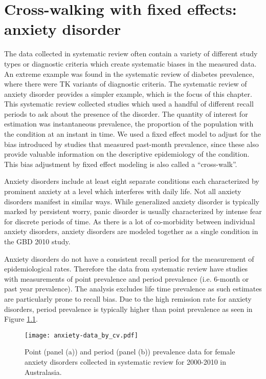 \chapter{Cross-walking with fixed effects: anxiety disorder}
\label{applications-efx_study_level}

The data collected in systematic review often contain a variety of
different study types or diagnostic criteria which create systematic
biases in the measured data.  An extreme example was found in the
systematic review of diabetes prevalence, where there were TK variants
of diagnostic criteria.  The systematic review of anxiety disorder
provides a simpler example, which is the focus of this chapter. This
systematic review collected studies which used a handful of different
recall periods to ask about the presence of the disorder. The quantity
of interest for estimation was instantaneous prevalence, the
proportion of the population with the condition at an instant in time.
We used a fixed effect model to adjust for the bias introduced by
studies that measured past-month prevalence, since these also provide
valuable information on the descriptive epidemiology of the condition.
This bias adjustment by fixed effect modeling is also called a
``cross-walk''.

Anxiety disorders include at least eight separate conditions each
characterized by prominent anxiety at a level which interferes with
daily life.  Not all anxiety disorders manifest in similar ways.
While generalized anxiety disorder is typically marked by persistent
worry, panic disorder is usually characterized by intense fear for
discrete periods of time. \cite{association_diagnostic_2000} As there is
a lot of co-morbidity between individual anxiety disorders, anxiety
disorders are modeled together as a single condition in the GBD 2010
study.

Anxiety disorders do not have a consistent recall period for the
measurement of epidemiological rates.  Therefore the data from
systematic review have studies with measurements of point prevalence
and period prevalence (i.e. 6-month or past year prevalence).  The
analysis excludes life time prevalence as such estimates are
particularly prone to recall bias.  Due to the high remission rate for
anxiety disorders, period prevalence is typically higher than point
prevalence as seen in Figure \ref{fig:app-anxiety data}.

    \begin{figure}[h]
        \begin{center}
            \texttt{[image: anxiety-data\_by\_cv.pdf]}
            \caption{Point (panel (a)) and period (panel (b)) prevalence data
              for female anxiety disorders collected in systematic review for
              2000-2010 in Australasia.}
            \label{fig:app-anxiety data}
        \end{center}
    \end{figure}

